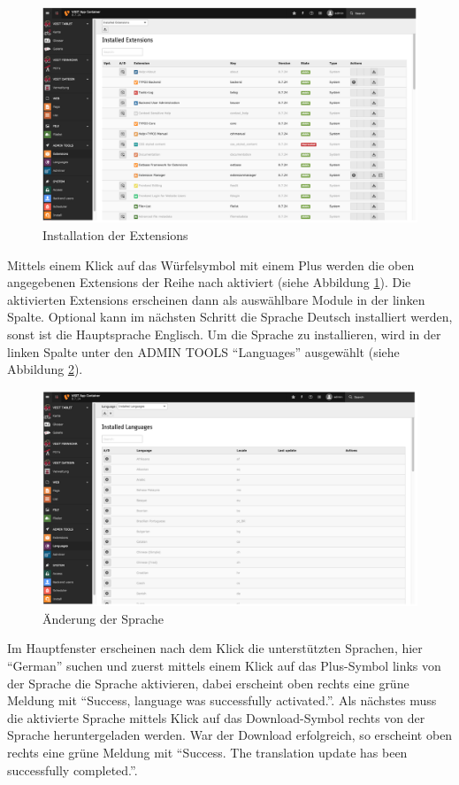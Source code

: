 \begin{figure}[ht!]
\centering
\includegraphics[width=12cm]{Figures/paula/extensions.png}
\caption{Installation der Extensions}
\label{img:extensions}
\end{figure}

Mittels einem Klick auf das Würfelsymbol mit einem Plus werden die oben angegebenen Extensions der Reihe nach aktiviert (siehe Abbildung \ref{img:extensions}). Die aktivierten Extensions erscheinen dann als auswählbare Module in der linken Spalte.
Optional kann im nächsten Schritt die Sprache Deutsch installiert werden, sonst ist die Hauptsprache Englisch. Um die Sprache zu installieren, wird in der linken Spalte unter den ADMIN TOOLS “Languages” ausgewählt (siehe Abbildung \ref{img:sprache_aendern}).

\begin{figure}[ht!]
\centering
\includegraphics[width=12cm]{Figures/paula/sprache_aendern.png}
\caption{Änderung der Sprache}
\label{img:sprache_aendern}
\end{figure}

Im Hauptfenster erscheinen nach dem Klick die unterstützten Sprachen, hier “German” suchen und zuerst mittels einem Klick auf das Plus-Symbol links von der Sprache die Sprache aktivieren, dabei erscheint oben rechts eine grüne Meldung mit “Success, language was successfully activated.”. Als nächstes muss die aktivierte Sprache mittels Klick auf das Download-Symbol rechts von der Sprache heruntergeladen werden. War der Download erfolgreich, so erscheint oben rechts eine grüne Meldung mit “Success. The translation update has been successfully completed.”.

